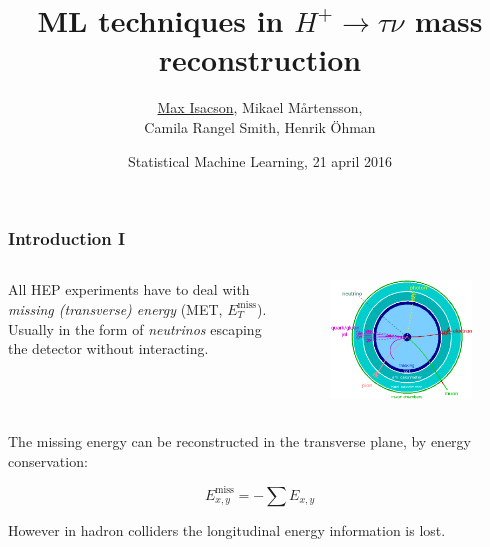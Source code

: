 \documentclass[9pt, lualatex]{beamer}
\title{ML techniques in $H^+\to \tau\nu$ mass reconstruction}
\author[Max, Mikael, Camila, Henrik]{
    \underline{Max Isacson}, Mikael Mårtensson,\\ Camila Rangel Smith, Henrik Öhman}
\institute[Uppsala University]{\uulogo}
\date{Statistical Machine Learning, 21 april 2016}
\begin{document}
\frame{\titlepage}

\begin{frame}
    \frametitle{Introduction I}

    \begin{columns}
    All HEP experiments have to deal with \emph{missing (transverse) energy} (MET, $E_T^\mathrm{miss}$).
    Usually in the form of \emph{neutrinos} escaping the detector without interacting.

        \begin{figure}
            \centering
            \includegraphics[width=\textwidth]{PID.png}
        \end{figure}

    \end{columns}

    The missing energy can be reconstructed in the transverse plane, by energy conservation:

    \begin{equation}
        E_{x,y}^\text{miss} = -\sum E_{x,y}
    \end{equation}

    However in hadron colliders the longitudinal energy information is lost.

\end{frame}
\end{document}
